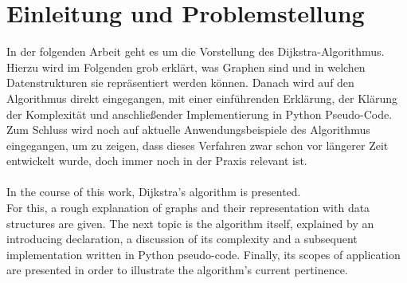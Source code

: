 \chapter{Einleitung und Problemstellung}

In der folgenden Arbeit geht es um die Vorstellung des Dijkstra-Algorithmus.
Hierzu wird im Folgenden grob erklärt, was Graphen sind und in welchen Datenstrukturen sie repräsentiert werden können.
Danach wird auf den Algorithmus direkt eingegangen, mit einer einführenden Erklärung, der Klärung der Komplexität und anschließender Implementierung in Python Pseudo-Code.
Zum Schluss wird noch auf aktuelle Anwendungsbeispiele des Algorithmus eingegangen, um zu zeigen, dass dieses Verfahren zwar schon vor längerer Zeit entwickelt wurde, doch immer noch in der Praxis relevant ist.
\\
\\
In the course of this work, Dijkstra's algorithm is presented. \\
For this, a rough explanation of graphs and their representation with data structures are given. 
The next topic is the algorithm itself, explained by an introducing declaration, a discussion of its complexity and a subsequent implementation written in Python pseudo-code.
Finally, its scopes of application are presented in order to illustrate the algorithm's current pertinence.